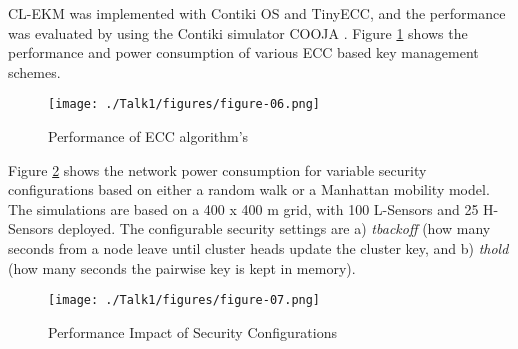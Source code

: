 \documentclass[12pt,a4paper,twoside]{report}
\begin{document}
CL-EKM was implemented with Contiki OS and TinyECC, and the performance was evaluated by using the Contiki simulator COOJA \cite{seo;etal:2015}. Figure \ref{fig:06} shows the performance and power consumption of various ECC based key management schemes. \par
\begin{figure}[ht]
	\begin{center}
  \texttt{[image: ./Talk1/figures/figure-06.png]}
  \end{center}
  \caption{Performance of ECC algorithm's \cite{seo;etal:2015}}
  \label{fig:06}
\end{figure}

Figure \ref{fig:07} shows the network power consumption for variable security configurations based on either a random walk or a Manhattan mobility model. The simulations are based on a 400 x 400 m grid, with 100 L-Sensors and 25 H-Sensors deployed. The configurable security settings are a) \emph{tbackoff} (how many seconds from a node leave until cluster heads update the cluster key, and b) \emph{thold} (how many seconds the pairwise key is kept in memory).\par
\begin{figure}[ht]
	\begin{center}
  \texttt{[image: ./Talk1/figures/figure-07.png]}
  \end{center}
  \caption{Performance Impact of Security Configurations \cite{seo;etal:2015}}
  \label{fig:07}
\end{figure}

\end{document}
